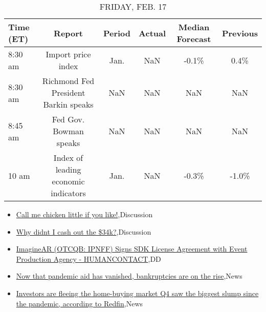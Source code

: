 \documentclass{article}%
\begin{document}
\begin{table}[htbp]%
\caption{FRIDAY, FEB. 17}%
\centering%
\begin{adjustbox}{width=1\textwidth}%
\begin{tabular}{lccccc}
\toprule
Time (ET) &                               Report & Period & Actual & Median Forecast & Previous \\
\midrule
  8:30 am &                   Import price index &   Jan. &    NaN &           -0.1\% &     0.4\% \\
  8:30 am & Richmond Fed President Barkin speaks &    NaN &    NaN &             NaN &      NaN \\
  8:45 am &               Fed Gov. Bowman speaks &    NaN &    NaN &             NaN &      NaN \\
    10 am & Index of leading economic indicators &   Jan. &    NaN &           -0.3\% &    -1.0\% \\
\bottomrule
\end{tabular}
%
\end{adjustbox}%
\end{table}

%
\begin{itemize}%
\item%
\href{https://reddit.com/r/wallstreetbets/comments/115bews/call\_me\_chicken\_little\_if\_you\_like/}{Call me chicken little if you like!},Discussion%
\item%
\href{https://reddit.com/r/wallstreetbets/comments/115ayv0/why\_didnt\_i\_cash\_out\_the\_34k/}{Why didnt I cash out the \$34k?},Discussion%
\item%
\href{https://reddit.com/r/Baystreetbets/comments/114taoc/imaginear\_otcqb\_ipnff\_signs\_sdk\_license\_agreement/}{ImagineAR (OTCQB: IPNFF) Signs SDK License Agreement with Event Production Agency - HUMANCONTACT},DD%
\item%
\href{https://reddit.com/r/Economics/comments/1150438/now\_that\_pandemic\_aid\_has\_vanished\_bankruptcies/}{Now that pandemic aid has vanished, bankruptcies are on the rise},News%
\item%
\href{https://reddit.com/r/Economics/comments/114x9oc/investors\_are\_fleeing\_the\_homebuying\_market\_q4/}{Investors are fleeing the home-buying market  Q4 saw the biggest slump since the pandemic, according to Redfin},News%
\end{itemize}%
\end{document}
